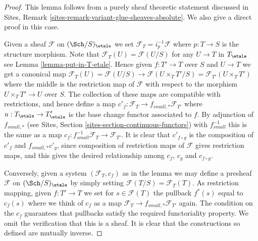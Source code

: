 \begin{proof}
This lemma follows from a purely sheaf theoretic statement discussed
in Sites, Remark \ref{sites-remark-variant-glue-sheaves-absolute}.
We also give a direct proof in this case.

\medskip\noindent
Given a sheaf $\mathcal{F}$ on $(\Sch/S)_\etale$
we set $\mathcal{F}_T = i_p^{-1}\mathcal{F}$ where $p : T \to S$
is the structure morphism. Note that
$\mathcal{F}_T(U) = \mathcal{F}(U/S)$ for any $U \to T$
in $T_\etale$ see Lemma \ref{lemma-put-in-T-etale}.
Hence given $f : T' \to T$ over $S$ and $U \to T$ we get a canonical
map $\mathcal{F}_T(U) = \mathcal{F}(U/S) \to \mathcal{F}(U \times_T T'/S)
= \mathcal{F}_{T'}(U \times_T T')$ where the middle is the restriction map
of $\mathcal{F}$ with respect to the morphism
$U \times_T T' \to U$ over $S$. The collection of these maps are
compatible with restrictions, and hence define a map
$c'_f : \mathcal{F}_T \to f_{small, *}\mathcal{F}_{T'}$ where
$u : T_\etale \to T'_\etale$ is the base change functor
associated to $f$. By adjunction of $f_{small, *}$ (see
Sites, Section \ref{sites-section-continuous-functors}) with
$f_{small}^{-1}$ this is the same as a map
$c_f : f_{small}^{-1}\mathcal{F}_T \to \mathcal{F}_{T'}$.
It is clear that $c'_{f \circ g}$ is the composition of
$c'_f$ and $f_{small, *}c'_g$, since composition of restriction maps
of $\mathcal{F}$ gives restriction maps, and this gives the desired
relationship among $c_f$, $c_g$ and $c_{f \circ g}$.

\medskip\noindent
Conversely, given a system $(\mathcal{F}_T, c_f)$ as in the lemma
we may define a presheaf $\mathcal{F}$ on
$(\Sch/S)_\etale$
by simply setting $\mathcal{F}(T/S) = \mathcal{F}_T(T)$. As restriction
mapping, given $f : T' \to T$ we set for $s \in \mathcal{F}(T)$
the pullback $f^*(s)$ equal to $c_f(s)$ where we think of $c_f$ as
a map $\mathcal{F}_T \to f_{small, *}\mathcal{F}_{T'}$ again.
The condition on the $c_f$ guarantees that
pullbacks satisfy the required functoriality property.
We omit the verification that this is a sheaf.
It is clear that the constructions so defined are mutually inverse.
\end{proof}























